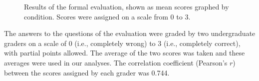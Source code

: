 \begin{figure}
\centering


	\caption[Results of the formal evaluation, shown as mean scores graphed by condition.]{Results of the formal evaluation, shown as mean scores graphed by condition.  Scores were assigned on a scale from 0 to 3.}
	\label{fig:results}
\end{figure}

The answers to the questions of the evaluation were graded by two undergraduate graders on a scale of 0 (i.e., completely wrong) to 3 (i.e., completely correct), with partial points allowed.  The average of the two scores was taken and these averages were used in our analyses.  The correlation coefficient (Pearson's $r$) between the scores assigned by each grader was 0.744.

